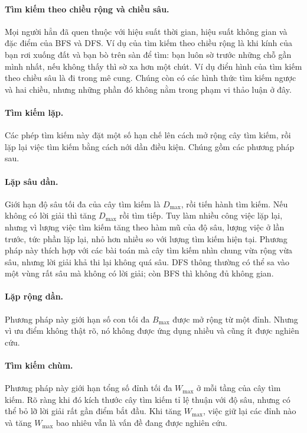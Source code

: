 \documentclass[11pt]{article}
\begin{document}
\paragraph{Tìm kiếm theo chiều rộng và chiều sâu.}
Mọi người hẳn đã quen thuộc với hiệu suất thời gian, hiệu suất không gian và
đặc điểm của BFS và DFS. Ví dụ của tìm kiếm theo chiều rộng là khi kính của
bạn rơi xuống đất và bạn bò trên sàn để tìm: bạn luôn sờ trước những chỗ gần
mình nhất, nếu không thấy thì sờ xa hơn một chút. Ví dụ điển hình của tìm
kiếm theo chiều sâu là đi trong mê cung. Chúng còn có các hình thức tìm kiếm
ngược và hai chiều, nhưng những phần đó không nằm trong phạm vi thảo luận ở
đây.

\paragraph{Tìm kiếm lặp.}
Các phép tìm kiếm này đặt một số hạn chế lên cách mở rộng cây tìm kiếm, rồi
lặp lại việc tìm kiếm bằng cách nới dần điều kiện. Chúng gồm các phương pháp
sau.

\paragraph{Lặp sâu dần.}
Giới hạn độ sâu tối đa của cây tìm kiếm là \(D_{\max}\), rồi tiến hành tìm
kiếm. Nếu không có lời giải thì tăng \(D_{\max}\) rồi tìm tiếp. Tuy làm nhiều
công việc lặp lại, nhưng vì lượng việc tìm kiếm tăng theo hàm mũ của độ sâu,
lượng việc ở lần trước, tức phần lặp lại, nhỏ hơn nhiều so với lượng tìm kiếm
hiện tại. Phương pháp này thích hợp với các bài toán mà cây tìm kiếm nhìn
chung vừa rộng vừa sâu, nhưng lời giải khả thi lại không quá sâu. DFS thông
thường có thể sa vào một vùng rất sâu mà không có lời giải; còn BFS thì không
đủ không gian.

\paragraph{Lặp rộng dần.}
Phương pháp này giới hạn số con tối đa \(B_{\max}\) được mở rộng từ một đỉnh.
Nhưng vì ưu điểm không thật rõ, nó không được ứng dụng nhiều và cũng ít được
nghiên cứu.

\paragraph{Tìm kiếm chùm.}
Phương pháp này giới hạn tổng số đỉnh tối đa \(W_{\max}\) ở mỗi tầng của cây
tìm kiếm. Rõ ràng khi đó kích thước cây tìm kiếm tỉ lệ thuận với độ sâu,
nhưng có thể bỏ lỡ lời giải rất gần điểm bắt đầu. Khi tăng \(W_{\max}\), việc
giữ lại các đỉnh nào và tăng \(W_{\max}\) bao nhiêu vẫn là vấn đề đang được
nghiên cứu.
\end{document}
